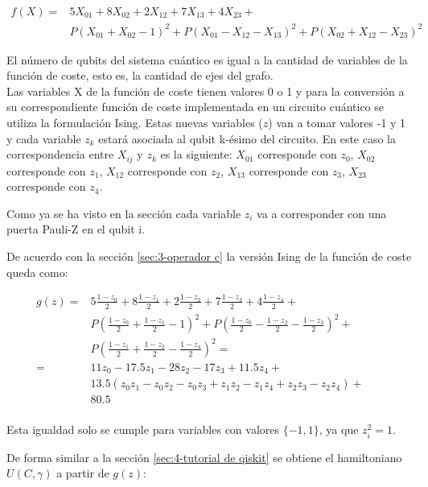 \begin{align*}
  f(X) = &5X_{01} + 8X_{02} + 2X_{12} + 7X_{13} + 4X_{23} + &&\\
         &P(X_{01} + X_{02} - 1)^2 + P(X_{01} - X_{12} - X_{13})^2 + P(X_{02} + X_{12} - X_{23})^2
\end{align*}

El número de qubits del sistema cuántico es igual a la cantidad de variables de la función de coste, esto es, la cantidad de ejes del grafo. \\
Las variables X de la función de coste tienen valores 0 o 1 y para la conversión a su correspondiente función de coste implementada en un circuito cuántico se utiliza la formulación Ising.  %
Estas nuevas variables ($z$) van a tomar valores -1 y 1 y cada variable $z_k$ estará asociada al qubit k-ésimo del circuito. En este caso la correspondencia entre $X_{ij}$ y $z_k$ es la siguiente:
$X_{01}$ corresponde con $z_0$,
$X_{02}$ corresponde con $z_1$,
$X_{12}$ corresponde con $z_2$,
$X_{13}$ corresponde con $z_3$,
$X_{23}$ corresponde con $z_4$.

Como ya se ha visto en la sección  %
cada variable $z_i$ va a corresponder con una puerta Pauli-Z en el qubit i.

De acuerdo con la sección \ref{sec:3-operador c} la versión Ising de la función de coste queda como:

\begin{align*}
  g(z) = &5\frac{1-z_0}{2} + 8\frac{1-z_1}{2} + 2\frac{1-z_2}{2} + 7\frac{1-z_3}{2} + 4\frac{1-z_4}{2} + &&\\
         &P(\frac{1-z_0}{2} + \frac{1-z_1}{2} - 1)^2 + P(\frac{1-z_0}{2} - \frac{1-z_2}{2} - \frac{1-z_3}{2})^2 + \\
         &P(\frac{1-z_1}{2} + \frac{1-z_2}{2} - \frac{1-z_4}{2})^2 = \\
       = & 11z_0 - 17.5z_1 - 28z_2 - 17z_3 + 11.5z_4 + \\
         &13.5(z_0z_1 - z_0z_2 - z_0z_3 + z_1z_2 - z_1z_4 + z_2z_3 - z_2z_4) + \\
         &80.5 \\
\end{align*}
\par
Esta igualdad solo se cumple para variables con valores \(\{-1, 1\}\), ya que \(z_i^2 = 1\). \\

\par
De forma similar a la sección \ref{sec:4-tutorial de qiskit} se obtiene el hamiltoniano $U(C, \gamma)$ a partir de $g(z)$:

